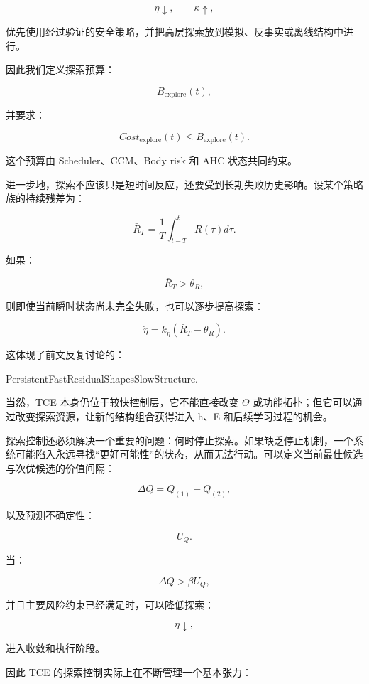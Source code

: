 \[
\eta\downarrow,
\qquad
\kappa\uparrow,
\]

优先使用经过验证的安全策略，并把高层探索放到模拟、反事实或离线结构中进行。

因此我们定义探索预算：

\[
B_{\mathrm{explore}}(t),
\]

并要求：

\[
Cost_{\mathrm{explore}}(t)
\le
B_{\mathrm{explore}}(t).
\]

这个预算由 Scheduler、CCM、Body risk 和 AHC 状态共同约束。

进一步地，探索不应该只是短时间反应，还要受到长期失败历史影响。设某个策略族的持续残差为：

\[
\bar R_T
=
\frac{1}{T}
\int_{t-T}^{t}R(\tau)d\tau.
\]

如果：

\[
\bar R_T>\theta_R,
\]

则即使当前瞬时状态尚未完全失败，也可以逐步提高探索：

\[
\dot\eta
=
k_\eta
(\bar R_T-\theta_R).
\]

这体现了前文反复讨论的：

\begin{statementbox}
PersistentFastResidualShapesSlowStructure.
\end{statementbox}

当然，TCE 本身仍位于较快控制层，它不能直接改变 $\Theta$ 或功能拓扑；但它可以通过改变探索资源，让新的结构组合获得进入 h、E 和后续学习过程的机会。

探索控制还必须解决一个重要的问题：何时停止探索。如果缺乏停止机制，一个系统可能陷入永远寻找“更好可能性”的状态，从而无法行动。可以定义当前最佳候选与次优候选的价值间隔：

\[
\Delta Q
=
Q_{(1)}-Q_{(2)},
\]

以及预测不确定性：

\[
U_Q.
\]

当：

\[
\Delta Q
>
\beta U_Q,
\]

并且主要风险约束已经满足时，可以降低探索：

\[
\eta\downarrow,
\]

进入收敛和执行阶段。

因此 TCE 的探索控制实际上在不断管理一个基本张力：

\begin{statementbox}
\centering
{}
\end{statementbox}

